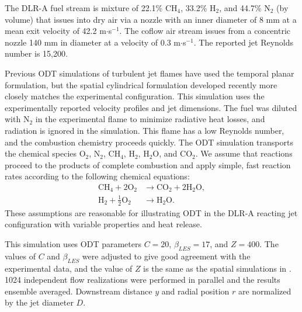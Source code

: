 \documentclass[preprint,12pt, a4paper]{elsarticle}
\begin{document}
The DLR-A fuel stream is mixture of 22.1\% CH$_4$, 33.2\% H$_2$, and 44.7\% N$_2$ (by volume) that issues into dry air via a nozzle with an inner diameter of 8 mm at a mean exit velocity of 42.2 m$\cdot$s$^{-1}$. The coflow air stream issues from a concentric nozzle 140 mm in diameter at a velocity of 0.3 m$\cdot$s$^{-1}$. The reported jet Reynolds number is 15,200.

Previous ODT simulations of turbulent jet flames have used the temporal planar formulation, but the spatial cylindrical formulation developed recently \cite{Lignell_2018} more closely matches the experimental configuration. This simulation uses the experimentally reported velocity profiles and jet dimensions.  
The fuel was diluted with N$_2$ in the experimental flame to minimize radiative heat losses, and radiation is ignored in the simulation. This flame has a low Reynolds number, and the combustion chemistry proceeds quickly. The ODT simulation transports the chemical species O$_2$, N$_2$, CH$_4$, H$_2$, H$_2$O, and CO$_2$. We assume that reactions proceed to the products of complete combustion and apply simple, fast reaction rates according to the following chemical equations:
\begin{align}
	\mathrm{CH}_4 + 2\mathrm{O}_2 & \rightarrow \mathrm{CO}_2 + 2\mathrm{H}_2\mathrm{O}, \\
	\mathrm{H}_2+\frac{1}{2}\mathrm{O}_2 & \rightarrow \mathrm{H}_2\mathrm{O}.
\end{align}
These assumptions are reasonable for illustrating ODT in the DLR-A reacting jet configuration with variable properties and heat release. 

This simulation uses ODT parameters $C=20$, $\beta_{LES}=17$, and $Z=400$. The values of $C$ and $\beta_{LES}$ were adjusted to give good agreement with the experimental data, and the value of $Z$ is the same as the spatial simulations in \cite{Monson_2016}. 1024 independent flow realizations were performed in parallel and the results ensemble averaged. Downstream distance $y$ and radial position $r$ are normalized by the jet diameter $D$.
\end{document}
